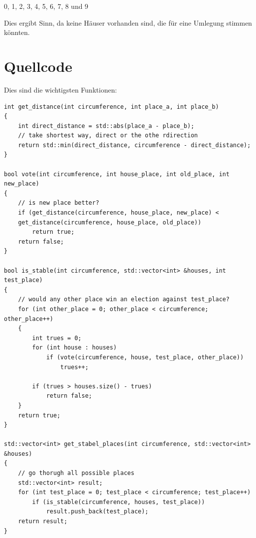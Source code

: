 \documentclass[a4paper,10pt,ngerman]{scrartcl}
\begin{document}
0, 1, 2, 3, 4, 5, 6, 7, 8 und 9

Dies ergibt Sinn, da keine Häuser vorhanden sind, die für eine Umlegung stimmen könnten.

\section{Quellcode}
Dies sind die wichtigsten Funktionen:
\begin{lstlisting}
int get_distance(int circumference, int place_a, int place_b)
{
    int direct_distance = std::abs(place_a - place_b);
    // take shortest way, direct or the othe rdirection
    return std::min(direct_distance, circumference - direct_distance);
}

bool vote(int circumference, int house_place, int old_place, int new_place)
{
    // is new place better?
    if (get_distance(circumference, house_place, new_place) <
    get_distance(circumference, house_place, old_place))
        return true;
    return false;
}

bool is_stable(int circumference, std::vector<int> &houses, int test_place)
{
    // would any other place win an election against test_place?
    for (int other_place = 0; other_place < circumference; other_place++)
    {
        int trues = 0;
        for (int house : houses)
            if (vote(circumference, house, test_place, other_place))
                trues++;

        if (trues > houses.size() - trues)
            return false;
    }
    return true;
}

std::vector<int> get_stabel_places(int circumference, std::vector<int> &houses)
{
    // go thorugh all possible places
    std::vector<int> result;
    for (int test_place = 0; test_place < circumference; test_place++)
        if (is_stable(circumference, houses, test_place))
            result.push_back(test_place);
    return result;
}
\end{lstlisting}
\end{document}
